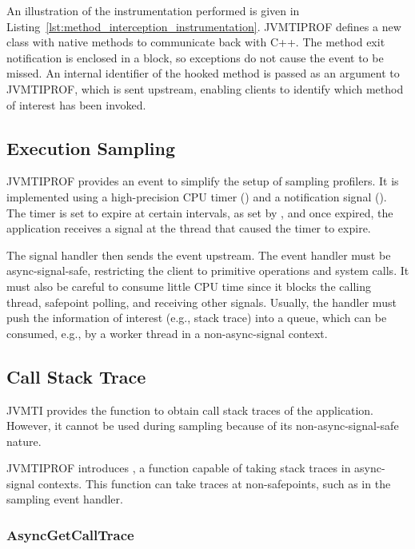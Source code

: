 An illustration of the instrumentation performed is given in Listing~\ref{lst:method_interception_instrumentation}. JVMTIPROF defines a new class with native methods to communicate back with C++. The method exit notification is enclosed in a  block, so exceptions do not cause the event to be missed. An internal identifier of the hooked method is passed as an argument to JVMTIPROF, which is sent upstream, enabling clients to identify which method of interest has been invoked.

\subsection{Execution Sampling}

JVMTIPROF provides an event to simplify the setup of sampling profilers. It is implemented using a high-precision CPU timer () and a notification signal (). The timer is set to expire at certain intervals, as set by , and once expired, the application receives a signal at the thread that caused the timer to expire.

The signal handler then sends the event upstream. The event handler must be async-signal-safe, restricting the client to primitive operations and system calls. It must also be careful to consume little CPU time since it blocks the calling thread, safepoint polling, and receiving other signals. Usually, the handler must push the information of interest (e.g., stack trace) into a queue, which can be consumed, e.g., by a worker thread in a non-async-signal context.

\subsection{Call Stack Trace} \label{sec:impl_callstacktrace}

JVMTI provides the  function to obtain call stack traces of the application. However, it cannot be used during sampling because of its non-async-signal-safe nature.

JVMTIPROF introduces , a function capable of taking stack traces in async-signal contexts. This function can take traces at non-safepoints, such as in the sampling event handler.

\subsubsection*{AsyncGetCallTrace}


